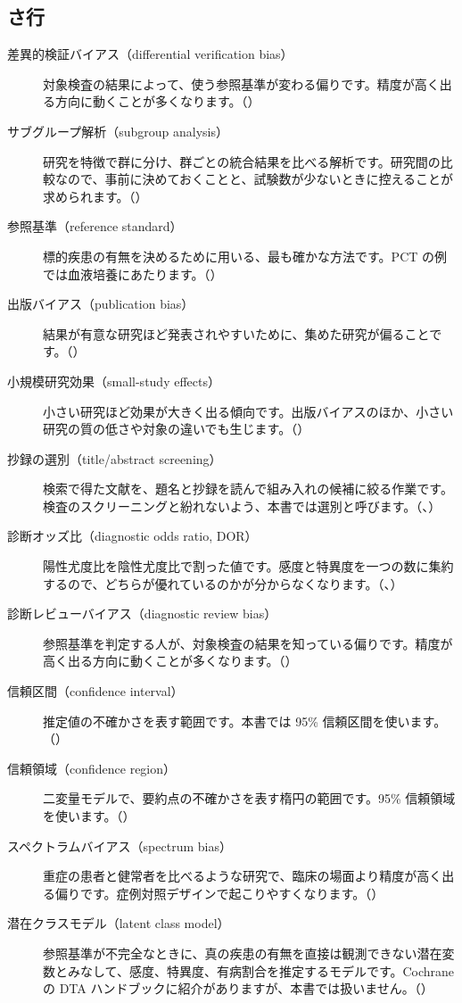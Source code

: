 \subsection*{さ行}
\begin{description}
\item[差異的検証バイアス（differential verification bias）] 対象検査の結果によって、使う参照基準が変わる偏りです。精度が高く出る方向に動くことが多くなります。（）
\item[サブグループ解析（subgroup analysis）] 研究を特徴で群に分け、群ごとの統合結果を比べる解析です。研究間の比較なので、事前に決めておくことと、試験数が少ないときに控えることが求められます。（）
\item[参照基準（reference standard）] 標的疾患の有無を決めるために用いる、最も確かな方法です。PCT の例では血液培養にあたります。（）
\item[出版バイアス（publication bias）] 結果が有意な研究ほど発表されやすいために、集めた研究が偏ることです。（）
\item[小規模研究効果（small-study effects）] 小さい研究ほど効果が大きく出る傾向です。出版バイアスのほか、小さい研究の質の低さや対象の違いでも生じます。（）
\item[抄録の選別（title/abstract screening）] 検索で得た文献を、題名と抄録を読んで組み入れの候補に絞る作業です。検査のスクリーニングと紛れないよう、本書では選別と呼びます。（、）
\item[診断オッズ比（diagnostic odds ratio, DOR）] 陽性尤度比を陰性尤度比で割った値です。感度と特異度を一つの数に集約するので、どちらが優れているのかが分からなくなります。（、）
\item[診断レビューバイアス（diagnostic review bias）] 参照基準を判定する人が、対象検査の結果を知っている偏りです。精度が高く出る方向に動くことが多くなります。（）
\item[信頼区間（confidence interval）] 推定値の不確かさを表す範囲です。本書では 95\% 信頼区間を使います。（）
\item[信頼領域（confidence region）] 二変量モデルで、要約点の不確かさを表す楕円の範囲です。95\% 信頼領域を使います。（）
\item[スペクトラムバイアス（spectrum bias）] 重症の患者と健常者を比べるような研究で、臨床の場面より精度が高く出る偏りです。症例対照デザインで起こりやすくなります。（）
\item[潜在クラスモデル（latent class model）] 参照基準が不完全なときに、真の疾患の有無を直接は観測できない潜在変数とみなして、感度、特異度、有病割合を推定するモデルです。Cochrane の DTA ハンドブックに紹介がありますが、本書では扱いません。（）
\end{description}

